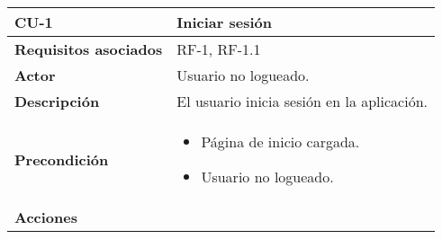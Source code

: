 \begin{longtable}[H]{@{}l|l@{}}
	\toprule
	\begin{minipage}[b]{0.23\columnwidth}\raggedright\strut
		\textbf{CU-1}\strut
	\end{minipage} & \begin{minipage}[b]{0.71\columnwidth}\raggedright\strut
		\textbf{Iniciar sesión}\strut
	\end{minipage}\tabularnewline
	\toprule
	\endhead
	\begin{minipage}[t]{0.23\columnwidth}\raggedright\strut
		\textbf{Requisitos asociados}\strut
	\end{minipage} & \begin{minipage}[t]{0.71\columnwidth}\raggedright\strut
		RF-1, RF-1.1\strut
	\end{minipage}\tabularnewline
	\midrule
	\begin{minipage}[t]{0.23\columnwidth}\raggedright\strut
		\textbf{Actor}\strut
	\end{minipage} & \begin{minipage}[t]{0.71\columnwidth}\raggedright\strut
		Usuario no logueado.\strut
	\end{minipage}\tabularnewline
	\midrule
	\begin{minipage}[t]{0.23\columnwidth}\raggedright\strut
		\textbf{Descripción}\strut
	\end{minipage} & \begin{minipage}[t]{0.71\columnwidth}\raggedright\strut
		El usuario inicia sesión en la aplicación.\strut
	\end{minipage}\tabularnewline
	\midrule
	\begin{minipage}[t]{0.23\columnwidth}\raggedright\strut
		\textbf{Precondición}\strut
	\end{minipage} & \begin{minipage}[t]{0.71\columnwidth}\raggedright
		\begin{itemize}
			\tightlist
			\item Página de inicio cargada.
			\item Usuario no logueado.
		\end{itemize}
	\end{minipage}\tabularnewline
	\midrule
	\begin{minipage}[t]{0.23\columnwidth}\raggedright\strut
		\textbf{Acciones}\strut
	\end{minipage} & \begin{minipage}[t]{0.71\columnwidth}\raggedright
		\begin{enumerate}

\end{enumerate}
\end{minipage}
\end{longtable}
